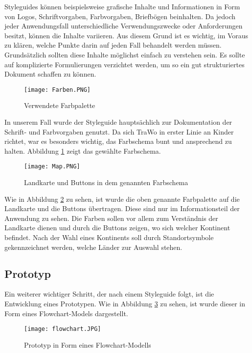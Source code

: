 Styleguides können beispielsweise grafische Inhalte und Informationen in Form von Logos, Schriftvorgaben, Farbvorgaben, Briefbögen beinhalten. Da jedoch jeder Anwendungsfall unterschiedliche Verwendungszwecke oder Anforderungen besitzt, können die Inhalte variieren. Aus diesem Grund ist es wichtig, im Voraus zu klären, welche Punkte darin auf jeden Fall behandelt werden müssen. Grundsätzlich sollten diese Inhalte möglichst einfach zu verstehen sein. Es sollte auf komplizierte Formulierungen verzichtet werden, um so ein gut strukturiertes Dokument schaffen zu können. 

\begin{figure} [h]
\centering
\texttt{[image: Farben.PNG]}
\caption{Verwendete Farbpalette}
\label{fig:farben}
\end{figure}

In unserem Fall wurde der Styleguide hauptsächlich zur Dokumentation der Schrift- und Farbvorgaben genutzt. Da sich TraWo in erster Linie an Kinder richtet, war es besonders wichtig, das Farbschema bunt und ansprechend zu halten. Abbildung \ref{fig:farben} zeigt das gewählte Farbschema.

\begin{figure} [h]
\centering
\texttt{[image: Map.PNG]}
\caption{Landkarte und Buttons in dem genannten Farbschema}
\label{fig:map}
\end{figure}

Wie in Abbildung \ref{fig:map} zu sehen, ist wurde die oben genannte Farbpalette auf die Landkarte und die Buttons übertragen. Diese sind nur im Informationsteil der Anwendung zu sehen. Die Farben sollen vor allem zum Verständnis der Landkarte dienen und durch die Buttons zeigen, wo sich welcher Kontinent befindet. Nach der Wahl eines Kontinents soll durch Standortsymbole gekennzeichnet werden, welche Länder zur Auswahl stehen.

\subsection{Prototyp}\label{prototyp}
Ein weiterer wichtiger Schritt, der nach einem Styleguide folgt, ist die Entwicklung eines Prototypen. Wie in Abbildung \ref{fig:flowchart} zu sehen, ist wurde dieser in Form eines Flowchart-Models dargestellt.

\begin{figure} [h]
\centering
\texttt{[image: flowchart.JPG]}
\caption{Prototyp in Form eines Flowchart-Modells}
\label{fig:flowchart}
\end{figure}


